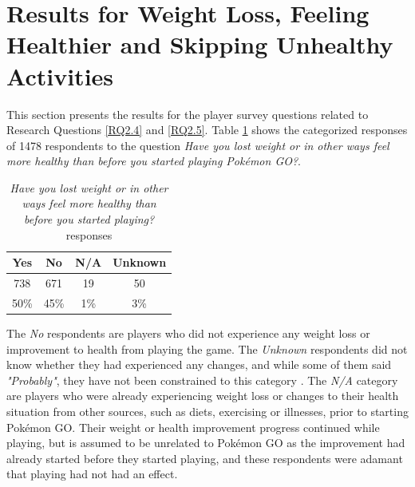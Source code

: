 

\section{Results for Weight Loss, Feeling Healthier and Skipping Unhealthy Activities}

This section presents the results for the player survey questions related to Research Questions \ref{RQ2.4} and \ref{RQ2.5}. Table \ref{tbl:lost-weight-or-feeling-healthier} shows the categorized responses of 1478 respondents to the question \emph{Have you lost weight or in other ways feel more healthy than before you started playing Pokémon GO?}.

\begin{table}[h]
	\centering
	\caption{\emph{Have you lost weight or in other ways feel more healthy than before you started playing?} responses}
	\label{tbl:lost-weight-or-feeling-healthier}
	\begin{tabular}{|c|c|c|c|}
		\hline
		\textbf{Yes}	& \textbf{No}	& \textbf{N/A}	& \textbf{Unknown}\\
		\hline\hline
		738		& 671	& 19	& 50\\
		50\%	& 45\%	& 1\%	& 3\%\\\hline
	\end{tabular}
\end{table}

The \emph{No} respondents are players who did not experience any weight loss or improvement to health from playing the game. The \emph{Unknown} respondents did not know whether they had experienced any changes, and while some of them said \emph{"Probably"}, they have not been constrained to this category . The \emph{N/A} category are players who were already experiencing weight loss or changes to their health situation from other sources, such as diets, exercising or illnesses, prior to starting Pokémon GO. Their weight or health improvement progress continued while playing, but is assumed to be unrelated to Pokémon GO as the improvement had already started before they started playing, and these respondents were adamant that playing had not had an effect.


